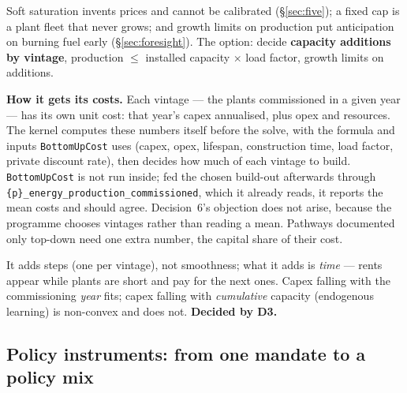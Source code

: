 \documentclass[11pt,a4paper]{article}
\newcommand{\var}[1]{\texttt{\small #1}}
\begin{document}
Soft saturation invents prices and cannot be calibrated (\S\ref{sec:five}); a fixed cap is a
plant fleet that never grows; and growth limits on production put anticipation on burning
fuel early (\S\ref{sec:foresight}). The option: decide \textbf{capacity additions by vintage},
production $\le$ installed capacity $\times$ load factor, growth limits on additions.

\textbf{How it gets its costs.} Each vintage --- the plants commissioned in a given year --- has
its own unit cost: that year's capex annualised, plus opex and resources. The kernel computes
these numbers itself before the solve, with the formula and inputs \var{BottomUpCost} uses
(capex, opex, lifespan, construction time, load factor, private discount rate), then decides
how much of each vintage to build. \var{BottomUpCost} is not run inside; fed the chosen
build-out afterwards through \var{\{p\}\_energy\_production\_commissioned}, which it already
reads, it reports the mean costs and should agree. Decision~6's objection does not arise,
because the programme chooses vintages rather than reading a mean. Pathways documented only
top-down need one extra number, the capital share of their cost.

It adds steps (one per vintage), not smoothness; what it adds is \emph{time} --- rents appear
while plants are short and pay for the next ones. Capex falling with the commissioning
\emph{year} fits; capex falling with \emph{cumulative} capacity (endogenous learning) is
non-convex and does not. \textbf{Decided by D3.}

\subsection{Policy instruments: from one mandate to a policy mix}
\end{document}
